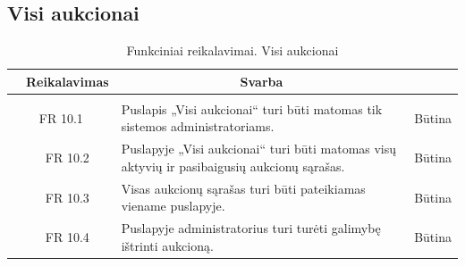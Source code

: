 \documentclass{VUMIFPSkursinis}
\begin{document}
\subsection{Visi aukcionai}
\begin{table}[H]
	\caption{Funkciniai reikalavimai. Visi aukcionai}
	\begin{tabular}{|p{1cm}|p{1cm}|p{}|p{}|}
		\hline 
		\rowcolor{gray!50}
		\multicolumn{2}{|c|}{{\bfseries Kodas}}&
		\multicolumn{1}{c|}{{\bfseries Reikalavimas}}&
		\multicolumn{1}{c|}{{\bfseries Svarba}}\\
		\hline
		\rowcolor{lightgray}
		\multicolumn{4}{|c|}{Visi aukcionai}\\				
		\hline
		\multicolumn{2}{|c|}{FR 10.1}&
		{Puslapis „Visi aukcionai“ turi būti matomas tik sistemos administratoriams.
		}&		
		\multicolumn{1}{c|}{Būtina}\\
		\hline
		\multicolumn{1}{|c}{}&
		\multicolumn{1}{c|}{FR 10.2}&
		{Puslapyje „Visi aukcionai“ turi būti matomas visų aktyvių ir pasibaigusių aukcionų sąrašas.
		}&		
		\multicolumn{1}{c|}{Būtina}\\
		\hline	
		\multicolumn{1}{|c}{}&
		\multicolumn{1}{c|}{FR 10.3}&
		{Visas aukcionų sąrašas turi būti pateikiamas viename puslapyje.
		}&
		\multicolumn{1}{c|}{Būtina}\\									
		\hline
		\multicolumn{1}{|c}{}&
		\multicolumn{1}{c|}{FR 10.4}&
		{Puslapyje administratorius turi turėti galimybę ištrinti aukcioną.
		}&
		\multicolumn{1}{c|}{Būtina}\\									
		\hline
	\end{tabular}		
\end{table}
\end{document}
